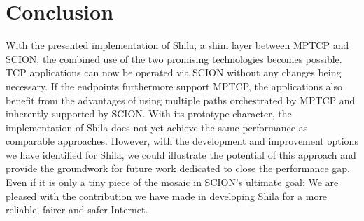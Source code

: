 \chapter{Conclusion}
\label{chap:Conclusion}

With the presented implementation of Shila, a shim layer between MPTCP and SCION, the combined use of the two promising technologies becomes possible. TCP applications can now be operated via SCION without any changes being necessary. If the endpoints furthermore support MPTCP, the applications also benefit from the advantages of using multiple paths orchestrated by MPTCP and inherently supported by SCION. With its prototype character, the implementation of Shila does not yet achieve the same performance as comparable approaches. However, with the development and improvement options we have identified for Shila, we could illustrate the potential of this approach and provide the groundwork for future work dedicated to close the performance gap. Even if it is only a tiny piece of the mosaic in SCION's ultimate goal: We are pleased with the contribution we have made in developing Shila for a more reliable, fairer and safer Internet.